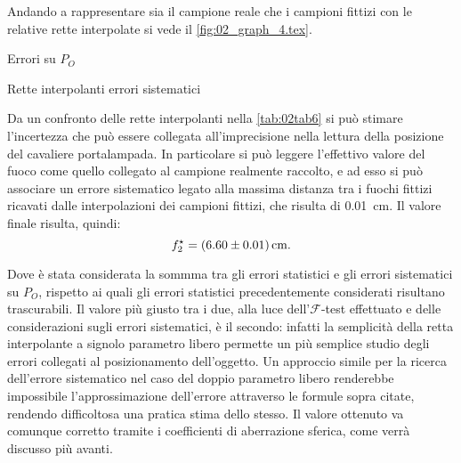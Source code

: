 Andando a rappresentare sia il campione reale che i campioni fittizi con le relative rette interpolate si vede il 
\autoref{fig:02_graph_4.tex}.
\begin{grafico} \centering  \caption{Errori su $P_O$} \label{fig:02_graph_4.tex} \end{grafico}
\begin{tabella}
	\centering
	
	\caption{Rette interpolanti errori sistematici}
	\label{tab:02tab6}
\end{tabella}
Da un confronto delle rette interpolanti nella \autoref{tab:02tab6} si può stimare l'incertezza che
 può essere collegata all'imprecisione nella lettura della
 posizione del cavaliere portalampada. In particolare si può leggere l'effettivo valore del fuoco come quello collegato al
 campione realmente raccolto, e ad esso si può associare un errore sistematico legato alla massima distanza tra i fuochi fittizi
 ricavati dalle interpolazioni dei campioni fittizi, che risulta di 0.01~cm. Il valore finale risulta, quindi:
\[f^{\star}_2 = (6.60 \pm 0.01) \,\mathrm{cm}.\]

Dove è stata considerata la sommma tra gli errori statistici e gli errori sistematici su $P_O$, rispetto ai quali gli
 errori statistici precedentemente considerati risultano trascurabili.
 Il valore più giusto tra i due, alla luce dell'$\mathcal{F}$-test effettuato e delle considerazioni sugli errori sistematici, è il secondo:
 infatti la semplicità della retta interpolante a signolo parametro libero permette un più semplice studio degli errori collegati
 al posizionamento dell'oggetto. Un approccio simile per la ricerca dell'errore sistematico nel caso del doppio parametro libero
 renderebbe impossibile l'approssimazione dell'errore attraverso le formule sopra citate, rendendo difficoltosa una pratica stima
 dello stesso. Il valore ottenuto va comunque corretto tramite i coefficienti di aberrazione sferica, come verrà discusso più avanti.
